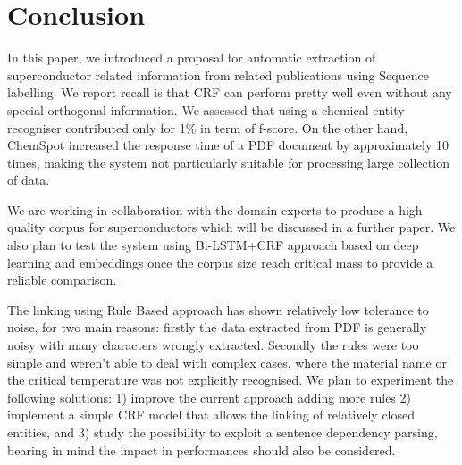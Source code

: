 \documentclass{article}
\begin{document}
\section{Conclusion}
In this paper, we introduced a proposal for automatic extraction of superconductor related information from related publications using Sequence labelling. We report recall is that CRF can perform pretty well even without any special orthogonal information. We assessed that using a chemical entity recogniser contributed only for 1\% in term of f-score. On the other hand, ChemSpot increased the response time of a PDF document by approximately 10 times, making the system not particularly suitable for processing large collection of data. 

We are working in collaboration with the domain experts to produce a high quality corpus for superconductors which will be discussed in a further paper. 
We also plan to test the system using Bi-LSTM+CRF approach based on deep learning and embeddings once the corpus size reach critical mass to provide a reliable comparison. 

The linking using Rule Based approach has shown relatively low tolerance to noise, for two main reasons: firstly the data extracted from PDF is generally noisy with many characters wrongly extracted. Secondly the rules were too simple and weren't able to deal with complex cases, where the material name or the critical temperature was not explicitly recognised. 
We plan to experiment the following solutions: 1) improve the current approach adding more rules 2) implement a simple CRF model that allows the linking of relatively closed entities, and 3) study the possibility to exploit a sentence dependency parsing, bearing in mind the impact in performances should also be considered.

% 
\pagebreak



\end{document}
